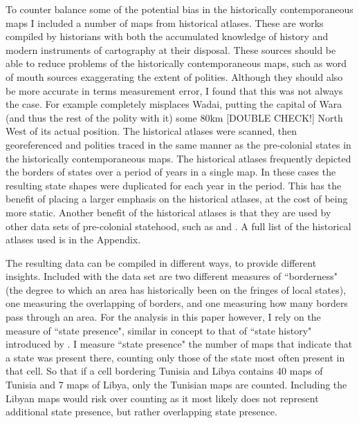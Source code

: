 \documentclass[12pt]{article}
\begin{document}

To counter balance some of the potential bias in the historically
contemporaneous maps I included a number of maps from historical atlases. These
are works compiled by historians with both the accumulated knowledge of history
and modern instruments of cartography at their disposal. These sources should be
able to reduce problems of the historically contemporaneous maps, such as word
of mouth sources exaggerating the extent of polities. Although they should also
be more accurate in terms measurement error, I found that this was not always
the case. For example \citep{Kasule1998} completely misplaces Wadai, putting the
capital of Wara (and thus the rest of the polity with it) some 80km [DOUBLE
CHECK!] North West of its actual position. The historical atlases were scanned,
then georeferenced and polities traced in the same manner as the pre-colonial
states in the historically contemporaneous maps. The historical atlases
frequently depicted the borders of states over a period of years in a single
map. In these cases the resulting state shapes were duplicated for each year in
the period. This has the benefit of placing a larger emphasis on the historical
atlases, at the cost of being more static. Another benefit of the historical
atlases is that they are used by other data sets of pre-colonial statehood, such
as \citet{Paine2019} and \citet{Depetris-Chauvin2016}. A full list of the
historical atlases used is in the Appendix.

The resulting data can be compiled in different ways, to provide different
insights. Included with the data set are two different measures of ``borderness"
(the degree to which an area has historically been on the fringes of local
states), one measuring the overlapping of borders, and one measuring how many
borders pass through an area. For the analysis in this paper however, I rely on
the measure of ``state presence", similar in concept to that of ``state history"
introduced by \citet{Depetris-Chauvin2016}. I measure ``state presence" the
number of maps that indicate that a state was present there, counting only those
of the state most often present in that cell. So that if a cell bordering
Tunisia and Libya contains 40 maps of Tunisia and 7 maps of Libya, only the
Tunisian maps are counted. Including the Libyan maps would risk over counting as
it most likely does not represent additional state presence, but rather
overlapping state presence. 

\end{document}
